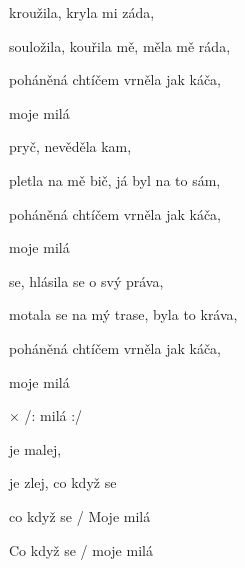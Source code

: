 

\zs
{} kroužila, kryla mi záda,

souložila, kouřila mě, měla mě ráda,

poháněná chtíčem vrněla jak káča,

moje milá  
\ks

\zs
{} pryč, nevěděla kam,

pletla na mě bič, já byl na to sám,

poháněná chtíčem vrněla jak káča,

moje milá  
\ks

\zs
{} se, hlásila se o svý práva,

motala se na mý trase, byla to kráva,

poháněná chtíčem vrněla jak káča,

moje milá  
\ks

× /:  milá   :/

 

 je malej, 

 

 je zlej, co když se 

co když se  / Moje milá  

Co když se  / moje milá  

\kr

\kp



















